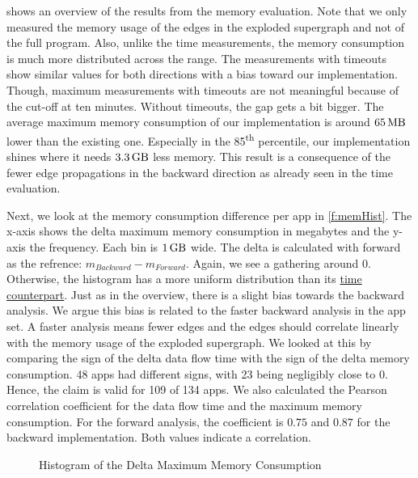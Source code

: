 \documentclass[../draft.tex]{subfiles}
\begin{document}
     shows an overview of the results from the memory evaluation.
    Note that we only measured the memory usage of the edges in the exploded supergraph and not of the full program.
    Also, unlike the time measurements, the memory consumption is much more distributed across the range.
    The measurements with timeouts show similar values for both directions with a bias toward our implementation.
    Though, maximum measurements with timeouts are not meaningful because of the cut-off at ten minutes.
    Without timeouts, the gap gets a bit bigger.
    The average maximum memory consumption of our implementation is around $\SI{65}{\mega\byte}$ lower than the existing one. 
    Especially in the 85\textsuperscript{th} percentile, our implementation shines where it needs $\SI{3.3}{\giga\byte}$ less memory.
    This result is a consequence of the fewer edge propagations in the backward direction as already seen in the time evaluation.

    Next, we look at the memory consumption difference per app in \autoref{f:memHist}.
    The x-axis shows the delta maximum memory consumption in megabytes and the y-axis the frequency.
    Each bin is $\SI{1}{\giga\byte}$ wide.
    The delta is calculated with forward as the refrence: $m_{\mathit{Backward}}-m_{\mathit{Forward}}$.
    Again, we see a gathering around $0$. 
    Otherwise, the histogram has a more uniform distribution than its \hyperref[f:deltaHist]{time counterpart}.
    Just as in the overview, there is a slight bias towards the backward analysis.
    We argue this bias is related to the faster backward analysis in the app set. 
    A faster analysis means fewer edges\footnotemark{} and the edges should correlate linearly with the memory usage of the exploded supergraph.
    We looked at this by comparing the sign of the delta data flow time with the sign of the delta memory consumption. 
    48 apps had different signs, with 23 being negligibly close to 0. 
    Hence, the claim is valid for 109 of 134 apps.
    We also calculated the Pearson correlation coefficient for the data flow time and the maximum memory consumption.
    For the forward analysis, the coefficient is $0.75$ and $0.87$ for the backward implementation.
    Both values indicate a correlation.

    \begin{figure}[tbp]
        \centering
        \resizebox{0.75\columnwidth}{!}{
            
        }
        \caption{Histogram of the Delta Maximum Memory Consumption}
        \label{f:memHist}
    \end{figure}
\end{document}
